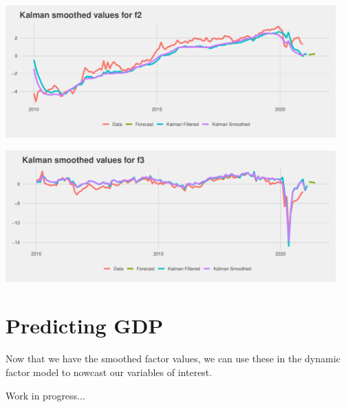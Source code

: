 \documentclass[11pt, letterpaper]{article}\usepackage[]{graphicx}\usepackage[]{color}
\begin{document}
{\centering \includegraphics[width=5in,height=2in]{figure/unnamed-chunk-11-2} 

}




{\centering \includegraphics[width=5in,height=2in]{figure/unnamed-chunk-11-3} 

}





\section{Predicting GDP}
Now that we have the smoothed factor values, we can use these in the dynamic factor model to nowcast our variables of interest.

Work in progress...
\end{document}
